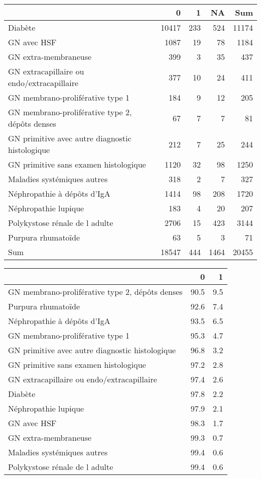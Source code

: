 \documentclass[11pt,a4paper]{article}\usepackage[]{graphicx}\usepackage[]{color}
\begin{document}
\begin{table}[H]
\centering
\begin{tabular}{lrrrr}
  \hline
 & 0 & 1 & NA & Sum \\ 
  \hline
Diabète & 10417 & 233 & 524 & 11174 \\ 
  GN avec HSF & 1087 & 19 & 78 & 1184 \\ 
  GN extra-membraneuse & 399 & 3 & 35 & 437 \\ 
  GN extracapillaire ou endo/extracapillaire & 377 & 10 & 24 & 411 \\ 
  GN membrano-proliférative type 1 & 184 & 9 & 12 & 205 \\ 
  GN membrano-proliférative type 2, dépôts denses & 67 & 7 & 7 & 81 \\ 
  GN primitive avec autre diagnostic histologique & 212 & 7 & 25 & 244 \\ 
  GN primitive sans examen histologique & 1120 & 32 & 98 & 1250 \\ 
  Maladies systémiques autres & 318 & 2 & 7 & 327 \\ 
  Néphropathie à dépôts d'IgA & 1414 & 98 & 208 & 1720 \\ 
  Néphropathie lupique & 183 & 4 & 20 & 207 \\ 
  Polykystose rénale de l adulte & 2706 & 15 & 423 & 3144 \\ 
  Purpura rhumatoïde & 63 & 5 & 3 & 71 \\ 
  Sum & 18547 & 444 & 1464 & 20455 \\ 
   \hline
\end{tabular}
\end{table}
\begin{table}[H]
\centering
\begin{tabular}{lrr}
  \hline
 & 0 & 1 \\ 
  \hline
GN membrano-proliférative type 2, dépôts denses & 90.5 & 9.5 \\ 
  Purpura rhumatoïde & 92.6 & 7.4 \\ 
  Néphropathie à dépôts d'IgA & 93.5 & 6.5 \\ 
  GN membrano-proliférative type 1 & 95.3 & 4.7 \\ 
  GN primitive avec autre diagnostic histologique & 96.8 & 3.2 \\ 
  GN primitive sans examen histologique & 97.2 & 2.8 \\ 
  GN extracapillaire ou endo/extracapillaire & 97.4 & 2.6 \\ 
  Diabète & 97.8 & 2.2 \\ 
  Néphropathie lupique & 97.9 & 2.1 \\ 
  GN avec HSF & 98.3 & 1.7 \\ 
  GN extra-membraneuse & 99.3 & 0.7 \\ 
  Maladies systémiques autres & 99.4 & 0.6 \\ 
  Polykystose rénale de l adulte & 99.4 & 0.6 \\ 
   \hline
\end{tabular}
\end{table}
\end{document}
